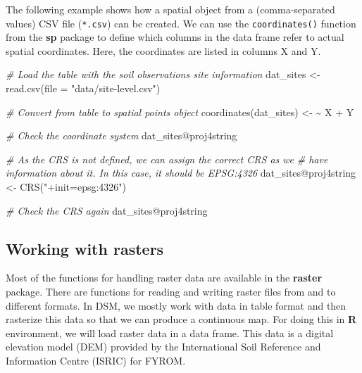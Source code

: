 \documentclass[
  10pt,
  b5paper,
  oneside]{book}
\newenvironment{Shaded}{\begin{snugshade}}{\end{snugshade}}
\newcommand{\AttributeTok}[1]{\textcolor[rgb]{0.77,0.63,0.00}{#1}}
\newcommand{\CommentTok}[1]{\textcolor[rgb]{0.56,0.35,0.01}{\textit{#1}}}
\newcommand{\ErrorTok}[1]{\textcolor[rgb]{0.64,0.00,0.00}{\textbf{#1}}}
\newcommand{\FunctionTok}[1]{\textcolor[rgb]{0.00,0.00,0.00}{#1}}
\newcommand{\NormalTok}[1]{#1}
\newcommand{\OtherTok}[1]{\textcolor[rgb]{0.56,0.35,0.01}{#1}}
\newcommand{\SpecialCharTok}[1]{\textcolor[rgb]{0.00,0.00,0.00}{#1}}
\newcommand{\StringTok}[1]{\textcolor[rgb]{0.31,0.60,0.02}{#1}}
\theoremstyle{definition}
\theoremstyle{definition}
\theoremstyle{definition}
\theoremstyle{definition}
\theoremstyle{remark}
\begin{document}
The following example shows how a spatial object from a (comma-separated values) CSV file (\texttt{*.csv}) can be created. We can use the \texttt{coordinates()} function from the \textbf{sp} package to define which columns in the data frame refer to actual spatial coordinates. Here, the coordinates are listed in columns X and Y.

\begin{Shaded}
\begin{Highlighting}[]
\CommentTok{\# Load the table with the soil observations site information}
\NormalTok{dat\_sites }\OtherTok{\textless{}{-}} \FunctionTok{read.csv}\NormalTok{(}\AttributeTok{file =} \StringTok{"data/site{-}level.csv"}\NormalTok{)}

\CommentTok{\# Convert from table to spatial points object}
\FunctionTok{coordinates}\NormalTok{(dat\_sites) }\OtherTok{\textless{}{-}} \ErrorTok{\textasciitilde{}}\NormalTok{ X }\SpecialCharTok{+}\NormalTok{ Y}

\CommentTok{\# Check the coordinate system}
\NormalTok{dat\_sites}\SpecialCharTok{@}\NormalTok{proj4string}

\CommentTok{\# As the CRS is not defined, we can assign the correct CRS as we}
\CommentTok{\# have information about it. In this case, it should be EPSG:4326}
\NormalTok{dat\_sites}\SpecialCharTok{@}\NormalTok{proj4string }\OtherTok{\textless{}{-}} \FunctionTok{CRS}\NormalTok{(}\StringTok{"+init=epsg:4326"}\NormalTok{)}

\CommentTok{\# Check the CRS again}
\NormalTok{dat\_sites}\SpecialCharTok{@}\NormalTok{proj4string}
\end{Highlighting}
\end{Shaded}

\hypertarget{working-with-rasters}{%
\subsection{Working with rasters}\label{working-with-rasters}}

Most of the functions for handling raster data are available in the \textbf{raster} package. There are functions for reading and writing raster files from and to different formats. In DSM, we mostly work with data in table format and then rasterize this data so that we can produce a continuous map. For doing this in \textbf{R} environment, we will load raster data in a data frame. This data is a digital elevation model (DEM) provided by the International Soil Reference and Information Centre (ISRIC) for FYROM.
\end{document}
